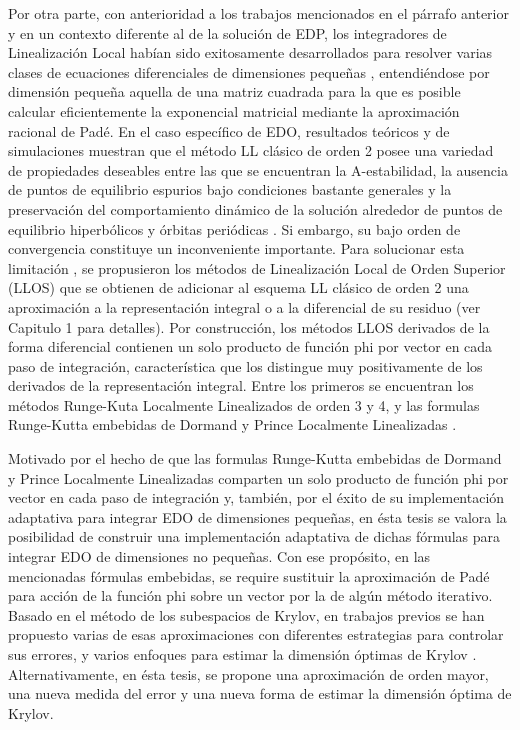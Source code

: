 Por otra parte, con anterioridad a los trabajos mencionados en el párrafo anterior y en un contexto diferente al de la solución de EDP, los integradores de Linealización Local habían sido exitosamente desarrollados para resolver varias clases de ecuaciones diferenciales de dimensiones pequeñas \cite{jimenez2020}, entendiéndose por dimensión pequeña aquella de una matriz cuadrada para la que es posible calcular eficientemente la exponencial matricial mediante la aproximación racional de Padé. En el caso específico de EDO, resultados teóricos y de simulaciones muestran que el método LL clásico de orden 2  \cite{pope1963exponential} posee una variedad de propiedades deseables entre las que se encuentran la A-estabilidad, la ausencia de puntos de equilibrio espurios bajo condiciones bastante generales y la preservación del comportamiento dinámico de la solución alrededor de puntos de equilibrio hiperbólicos y órbitas periódicas \cite{Jimenez02AMC}. Si embargo, su bajo orden de convergencia constituye un inconveniente importante. Para solucionar esta limitación \cite{delaCruz06,delaCruz07,Jimenez13}, se propusieron los métodos de Linealización Local de Orden Superior (LLOS) que se obtienen de adicionar al esquema LL clásico de orden 2 una aproximación a la representación integral o a la diferencial de su residuo (ver Capitulo 1 para detalles). Por construcción, los métodos LLOS derivados de la forma diferencial contienen un solo  producto de función phi por vector en cada paso de integración, característica que los distingue muy positivamente de los derivados de la representación integral. Entre los primeros se encuentran los métodos Runge-Kuta Localmente Linealizados de orden 3 y 4, y las formulas Runge-Kutta embebidas de Dormand y Prince Localmente Linealizadas \cite{delaCruz06,Jimenez13,Jimenez14AMC}.

Motivado por el hecho de que las formulas Runge-Kutta embebidas de Dormand y Prince Localmente Linealizadas comparten un solo producto de función phi por vector en cada paso de integración y, también, por el éxito de su implementación adaptativa para integrar EDO de dimensiones pequeñas, en ésta tesis se valora la posibilidad de construir una implementación adaptativa de dichas fórmulas para integrar EDO de dimensiones no pequeñas. Con ese propósito, en las mencionadas fórmulas embebidas, se require sustituir la aproximación de Padé para acción de la función phi sobre un vector por la de algún método iterativo. Basado en el método de los subespacios de Krylov, en trabajos previos se han propuesto varias de esas aproximaciones con diferentes estrategias para controlar sus errores, y varios enfoques para estimar la dimensión óptimas de Krylov \cite{hochbruck1998exponential,sidje1998expokit,niesen2012algorithm,gaudreault2018kiops}. Alternativamente, en ésta tesis, se propone una aproximación de orden mayor, una nueva medida del error y una nueva forma de estimar la dimensión óptima de Krylov.

